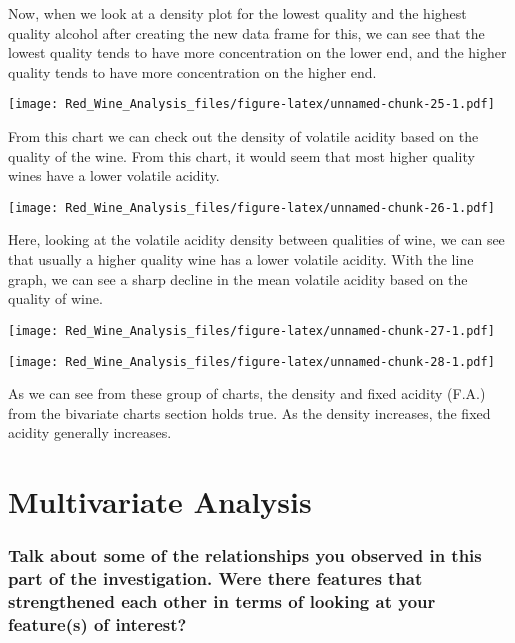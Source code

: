 \documentclass[]{article}
\begin{document}
Now, when we look at a density plot for the lowest quality and the
highest quality alcohol after creating the new data frame for this, we
can see that the lowest quality tends to have more concentration on the
lower end, and the higher quality tends to have more concentration on
the higher end.

\texttt{[image: Red\_Wine\_Analysis\_files/figure-latex/unnamed-chunk-25-1.pdf]}

From this chart we can check out the density of volatile acidity based
on the quality of the wine. From this chart, it would seem that most
higher quality wines have a lower volatile acidity.

\texttt{[image: Red\_Wine\_Analysis\_files/figure-latex/unnamed-chunk-26-1.pdf]}

Here, looking at the volatile acidity density between qualities of wine,
we can see that usually a higher quality wine has a lower volatile
acidity. With the line graph, we can see a sharp decline in the mean
volatile acidity based on the quality of wine.

\texttt{[image: Red\_Wine\_Analysis\_files/figure-latex/unnamed-chunk-27-1.pdf]}

\texttt{[image: Red\_Wine\_Analysis\_files/figure-latex/unnamed-chunk-28-1.pdf]}

As we can see from these group of charts, the density and fixed acidity
(F.A.) from the bivariate charts section holds true. As the density
increases, the fixed acidity generally increases.

\hypertarget{multivariate-analysis}{%
\section{Multivariate Analysis}\label{multivariate-analysis}}

\hypertarget{talk-about-some-of-the-relationships-you-observed-in-this-part-of-the-investigation.-were-there-features-that-strengthened-each-other-in-terms-of-looking-at-your-features-of-interest}{%
\subsubsection{Talk about some of the relationships you observed in this
part of the investigation. Were there features that strengthened each
other in terms of looking at your feature(s) of
interest?}\label{talk-about-some-of-the-relationships-you-observed-in-this-part-of-the-investigation.-were-there-features-that-strengthened-each-other-in-terms-of-looking-at-your-features-of-interest}}
\end{document}
